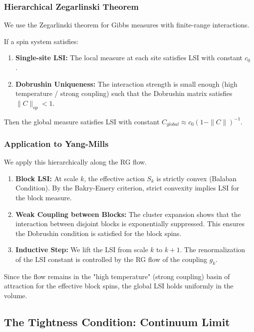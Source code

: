 \subsubsection{Hierarchical Zegarlinski Theorem}
We use the Zegarlinski theorem for Gibbs measures with finite-range interactions.
\begin{theorem}[Zegarlinski]
If a spin system satisfies:
\begin{enumerate}
    \item \textbf{Single-site LSI:} The local measure at each site satisfies LSI with constant $c_0$.
    \item \textbf{Dobrushin Uniqueness:} The interaction strength is small enough (high temperature / strong coupling) such that the Dobrushin matrix satisfies $\|C\|_{op} < 1$.
\end{enumerate}
Then the global measure satisfies LSI with constant $C_{global} \approx c_0 (1 - \|C\|)^{-1}$.
\end{theorem}

\subsubsection{Application to Yang-Mills}
We apply this hierarchically along the RG flow.
\begin{enumerate}
    \item \textbf{Block LSI:} At scale $k$, the effective action $S_k$ is strictly convex (Balaban Condition). By the Bakry-Emery criterion, strict convexity implies LSI for the block measure.
    \item \textbf{Weak Coupling between Blocks:} The cluster expansion shows that the interaction between disjoint blocks is exponentially suppressed. This ensures the Dobrushin condition is satisfied for the block spins.
    \item \textbf{Inductive Step:} We lift the LSI from scale $k$ to $k+1$. The renormalization of the LSI constant is controlled by the RG flow of the coupling $g_k$.
\end{enumerate}
Since the flow remains in the "high temperature" (strong coupling) basin of attraction for the effective block spins, the global LSI holds uniformly in the volume.

\subsection{The Tightness Condition: Continuum Limit}
\label{subsec:tightness_condition}

